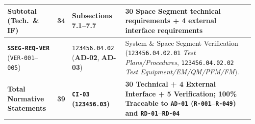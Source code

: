 {\begin{longtable}{|>{\raggedright\arraybackslash}p{}|>{\raggedright\arraybackslash}p{}|>{\raggedright\arraybackslash}p{}|>{\raggedright\arraybackslash}p{}|}
\textbf{Subtotal (Tech.\ \& IF)} & \textbf{34} & \textbf{Subsections 7.1--7.7} & \textbf{30 Space Segment technical requirements + 4 external interface requirements} \\ \hline
\textbf{\texttt{SSEG-REQ-VER}} \newline (\texttt{VER-001}--\texttt{005}) & 5 & \texttt{123456.04.02} (\textbf{AD-02}, \textbf{AD-03}) & System \& Space Segment Verification (\texttt{123456.04.02.01} \emph{Test Plans/Procedures}, \texttt{123456.04.02.02} \emph{Test Equipment/EM/QM/PFM/FM}). \\ \hline
\textbf{Total Normative Statements} & \textbf{39} & \textbf{\texttt{CI-03} (\texttt{123456.03})} & \textbf{30 Technical + 4 External Interface + 5 Verification; 100\% Traceable to \texttt{AD-01} (\texttt{R-001}--\texttt{R-049}) and \texttt{RD-01}--\texttt{RD-04}} \\ \hline
\end{longtable}}
